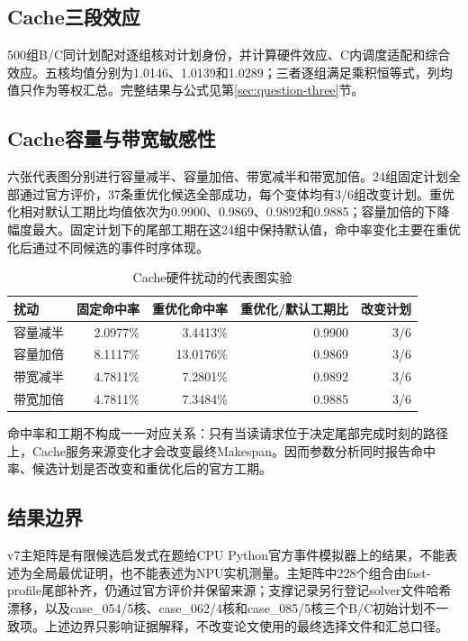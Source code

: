 \subsection{Cache三段效应}
500组B/C同计划配对逐组核对计划身份，并计算硬件效应、C内调度适配和综合效应。五核均值分别为1.0146、1.0139和1.0289；三者逐组满足乘积恒等式，列均值只作为等权汇总。完整结果与公式见第\ref{sec:question-three}节。

\subsection{Cache容量与带宽敏感性}
六张代表图分别进行容量减半、容量加倍、带宽减半和带宽加倍。24组固定计划全部通过官方评价，37条重优化候选全部成功，每个变体均有3/6组改变计划。重优化相对默认工期比均值依次为0.9900、0.9869、0.9892和0.9885；容量加倍的下降幅度最大。固定计划下的尾部工期在这24组中保持默认值，命中率变化主要在重优化后通过不同候选的事件时序体现。

\begin{table}[H]\centering\small
\caption{Cache硬件扰动的代表图实验}\label{tab:overall-cache-sensitivity}
\begin{tabular}{lrrrr}\toprule
扰动 & 固定命中率 & 重优化命中率 & 重优化/默认工期比 & 改变计划\\\midrule
容量减半 & 2.0977\% & 3.4413\% & 0.9900 & 3/6\\
容量加倍 & 8.1117\% & 13.0176\% & 0.9869 & 3/6\\
带宽减半 & 4.7811\% & 7.2801\% & 0.9892 & 3/6\\
带宽加倍 & 4.7811\% & 7.3484\% & 0.9885 & 3/6\\\bottomrule
\end{tabular}
\end{table}

命中率和工期不构成一一对应关系：只有当读请求位于决定尾部完成时刻的路径上，Cache服务来源变化才会改变最终Makespan。因而参数分析同时报告命中率、候选计划是否改变和重优化后的官方工期。

\subsection{结果边界}
v7主矩阵是有限候选启发式在题给CPU Python官方事件模拟器上的结果，不能表述为全局最优证明，也不能表述为NPU实机测量。主矩阵中228个组合由fast-profile尾部补齐，仍通过官方评价并保留来源；支撑记录另行登记solver文件哈希漂移，以及case\_054/5核、case\_062/4核和case\_085/5核三个B/C初始计划不一致项。上述边界只影响证据解释，不改变论文使用的最终选择文件和汇总口径。
